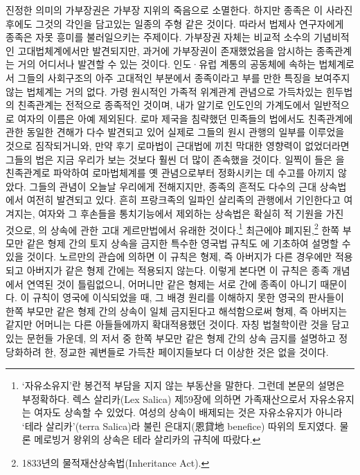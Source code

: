 진정한 의미의 가부장권은 가부장 지위의 죽음으로 소멸한다.
하지만 종족은 이 사라진 후에도 그것의 각인을 담고있는
일종의 주형 같은 것이다.
따라서 법제사 연구자에게 종족은 자못 흥미를 불러일으키는 주제이다.
가부장권 자체는 비교적 소수의 기념비적인 고대법체계에서만 발견되지만,
과거에 가부장권이 존재했었음을 암시하는 종족관계는
거의 어디서나 발견할 수 있는 것이다.
인도^^b7유럽 계통의 공동체에 속하는 법체계로서
그들의 사회구조의 아주 고대적인 부분에서
종족이라고 부를 만한 특징을 보여주지 않는 법체계는 거의 없다.
가령
원시적인 가족적 위계관계 관념으로 가득차있는
힌두법의 친족관계는 전적으로 종족적인 것이며,
내가 알기로 인도인의 가계도에서 일반적으로 여자의 이름은 아예 제외된다.
로마 제국을 침략했던 민족들의 법에서도
친족관계에 관한 동일한 견해가 다수 발견되고 있어
실제로
그들의 원시 관행의 일부를 이루었을 것으로 짐작되거니와,
만약 후기 로마법이 근대법에 끼친 막대한 영향력이 없었더라면
그들의 법은 지금 우리가 보는 것보다 훨씬 더 많이 존속했을 것이다.
일찍이 들은 을  친족관계로 파악하여
로마법체계를 옛 관념으로부터 정화시키는 데 수고를 아끼지 않았다.
그들의 관념이 오늘날 우리에게 전해지지만,
종족의 흔적도 다수의 근대 상속법에서 여전히 발견되고 있다.
흔히 프랑크족의 일파인 살리족의 관행에서
기인한다고 여겨지는,
여자와 그 후손들을 통치기능에서 제외하는 상속법은
확실히 적 기원을 가진 것으로,
의 상속에 관한
고대 게르만법에서 유래한 것이다.\footnote{%
  `자유소유지'란 봉건적 부담을 지지 않는 부동산을 말한다.
  그런데 본문의 설명은 부정확하다.
  렉스 살리카(Lex Salica) 제59장에 의하면
  가족재산으로서 자유소유지는 여자도 상속할 수 있었다.
  여성의 상속이 배제되는 것은 자유소유지가 아니라
  `테라 살리카'(terra Salica)라 불린 은대지(恩貸地 benefice) 따위의 토지였다.
  물론 메로빙거 왕위의 상속은 테라 살리카의 규칙에 따랐다.
  }
최근에야 폐지된,\footnote{%
  1833년의 물적재산상속법(Inheritance Act). }
한쪽 부모만 같은 형제 간의 토지 상속을 금지한
특수한 영국법 규칙도 에 기초하여 설명할 수 있을 것이다.
노르만의 관습에 의하면
이 규칙은  형제,
즉 아버지가 다른 경우에만 적용되고
아버지가 같은 형제 간에는 적용되지 않는다.
이렇게 본다면 이 규칙은 종족 개념에서 연역된 것이 틀림없으니,
어머니만 같은 형제는 서로 간에 종족이 아니기 때문이다.
이 규칙이 영국에 이식되었을 때,
그 배경 원리를 이해하지 못한 영국의 판사들이
한쪽 부모만 같은 형제 간의 상속이 일체 금지된다고 해석함으로써
 형제,
즉 아버지는 같지만 어머니는 다른 아들들에까지 확대적용했던 것이다.
자칭 법철학이란 것을 담고 있는 문헌들 가운데,
의 저서 중
한쪽 부모만 같은 형제 간의 상속 금지를 설명하고 정당화하려 한,
정교한 궤변들로 가득찬 페이지들보다 더 이상한 것은 없을 것이다.


